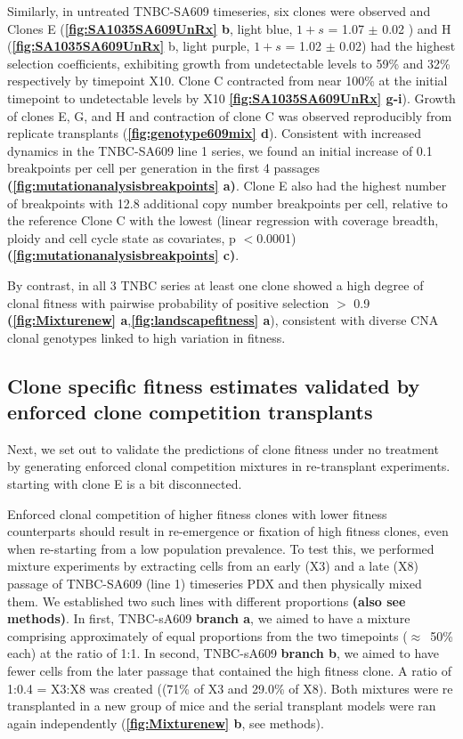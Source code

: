  
 Similarly, in untreated TNBC-SA609 timeseries, six clones were observed and Clones E (\textbf{\autoref{fig:SA1035SA609UnRx} b}, light blue, $1+s$ = 1.07 $\pm$ 0.02 ) and H (\textbf{\autoref{fig:SA1035SA609UnRx}} b, light purple, $1+s$ = 1.02 $\pm$ 0.02) had the highest selection coefficients, exhibiting growth from undetectable levels to 59\% and 32\% respectively by timepoint X10.
 Clone C contracted from near 100\% at the initial timepoint to undetectable levels by X10 \textbf{\autoref{fig:SA1035SA609UnRx} g-i}). Growth of clones E, G, and H and contraction of clone C was observed reproducibly from replicate transplants (\textbf{\autoref{fig:genotype609mix} d}).
 Consistent with increased dynamics in the TNBC-SA609 line 1 series, we found an initial increase of 0.1 breakpoints per cell per generation in the first 4 passages \textbf{(\autoref{fig:mutationanalysisbreakpoints} a)}.
 Clone E also had the highest number of breakpoints with 12.8 additional copy number breakpoints per cell, relative to the reference Clone C with the lowest (linear regression with coverage breadth, ploidy and cell cycle state as covariates, p $<$0.0001) \textbf{(\autoref{fig:mutationanalysisbreakpoints} c)}.

By contrast, in all 3 TNBC series at least one clone showed a high degree of clonal fitness with pairwise probability of positive selection $>$ 0.9  \textbf{(\autoref{fig:Mixturenew} a},\textbf{\autoref{fig:landscapefitness} a}), consistent with diverse CNA clonal genotypes linked to high variation in fitness.

\subsection{Clone specific fitness estimates validated by enforced clone competition transplants} 
Next, we set out to validate the predictions of clone fitness under no treatment by generating enforced clonal competition mixtures in re-transplant experiments. starting with clone E is a bit disconnected. 

Enforced clonal competition of higher fitness clones with lower fitness counterparts should result in re-emergence or fixation of high fitness clones, even when re-starting from a low population prevalence. To test this, we performed mixture experiments by extracting cells from an early (X3) and a late (X8) passage of TNBC-SA609 (line 1) timeseries PDX and then physically mixed them. We established two such lines with different proportions \textbf{(also see methods)}.
In first, TNBC-sA609 \textbf{branch a}, we aimed to have a mixture comprising approximately of equal proportions from the two timepoints ($\approx$~50\% each) at the ratio of 1:1. In second, TNBC-sA609 \textbf{branch b}, we aimed to have fewer cells from the later passage that contained the high fitness clone. A ratio of 1:0.4 = X3:X8 was created ((71\% of X3 and 29.0\% of X8). 
Both mixtures were re transplanted in a new group of mice and the serial transplant models were ran again independently (\textbf{\autoref{fig:Mixturenew} b}, see methods).

